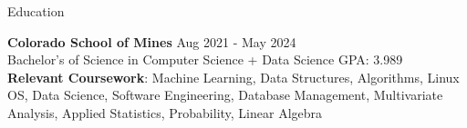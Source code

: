 \documentclass{resume} %
\begin{document}
\vspace{-10pt}

\begin{rSection}{Education}

{\bf Colorado School of Mines} \hfill {Aug 2021 - May 2024}\\
Bachelor's of Science in Computer Science + Data Science \hfill {GPA: 3.989}\\
\textbf{Relevant Coursework}: Machine Learning, Data Structures, Algorithms, Linux OS, Data Science, Software Engineering, Database Management, Multivariate Analysis, Applied Statistics, Probability, Linear Algebra



\end{rSection}
\vspace{-6pt}
\end{document}
